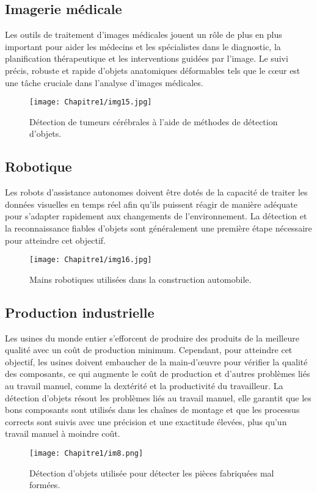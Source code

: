      \subsection{Imagerie médicale}
     Les outils de traitement d'images médicales jouent un rôle de plus en plus important pour aider les médecins et les spécialistes dans le diagnostic, la planification thérapeutique et les interventions guidées par l'image. Le suivi précis, robuste et rapide d'objets anatomiques déformables tels que le cœur est une tâche cruciale dans l'analyse d'images médicales.
     \begin{figure}[H]
          \centering
          \texttt{[image: Chapitre1/img15.jpg]}
          \caption{Détection de tumeurs cérébrales à l'aide de méthodes de détection d'objets.}
          \label{img15}
          \end{figure}

     \subsection{Robotique}
     Les robots d'assistance autonomes doivent être dotés de la capacité de traiter les données visuelles en temps réel afin qu'ils puissent réagir de manière adéquate pour s'adapter rapidement aux changements de l'environnement. La détection et la reconnaissance fiables d'objets sont généralement une première étape nécessaire pour atteindre cet objectif.
     \begin{figure}[H]
          \centering
          \texttt{[image: Chapitre1/img16.jpg]}
          \caption{Mains robotiques utilisées dans la construction automobile.}
          \label{img16}
          \end{figure}
     
     \subsection{Production industrielle}
     Les usines du monde entier s'efforcent de produire des produits de la meilleure qualité avec un coût de production minimum. Cependant, pour  atteindre cet objectif, les usines doivent embaucher de la main-d'œuvre pour vérifier la qualité des composants, ce qui augmente le coût de production et d'autres problèmes liés au travail manuel, comme la dextérité et la productivité du travailleur. La détection d'objets résout les problèmes liés au travail manuel, elle garantit que les bons composants sont utilisés dans les chaînes de montage et que les processus corrects sont suivis avec une précision et une exactitude élevées, plus qu'un travail manuel  à moindre coût.
     \begin{figure}[H]
          \centering
          \texttt{[image: Chapitre1/im8.png]}
          \caption{Détection d'objets utilisée pour détecter les pièces fabriquées mal formées.}
          \label{im8}
          \end{figure}
     
